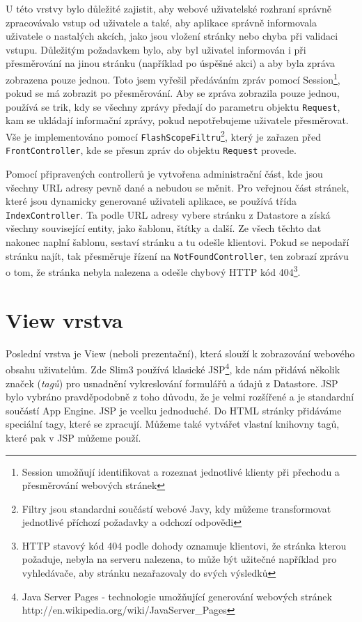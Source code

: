 U této vrstvy bylo důležité zajistit, aby webové uživatelské rozhraní správně zpracovávalo vstup od uživatele a také, aby aplikace správně informovala uživatele o nastalých akcích, jako jsou vložení stránky nebo chyba při validaci vstupu. Důležitým požadavkem bylo, aby byl uživatel informován i při přesměrování na jinou stránku (například po úspěšné akci) a aby byla zpráva zobrazena pouze jednou. Toto jsem vyřešil předáváním zpráv pomocí Session\footnote{Session umožňují identifikovat a rozeznat jednotlivé klienty při přechodu a přesměrování webových stránek}, pokud se má zobrazit po přesměrování. Aby se zpráva zobrazila pouze jednou, používá se trik, kdy se všechny zprávy předají do parametru objektu \verb|Request|, kam se ukládají informační zprávy, pokud nepotřebujeme uživatele přesměrovat. Vše je implementováno pomocí \verb|FlashScopeFiltru|\footnote{Filtry jsou standardni součástí webové Javy, kdy můžeme transformovat jednotlivé příchozí požadavky a odchozí odpovědi}, který je zařazen před \verb|FrontController|, kde se přesun zpráv do objektu \verb|Request| provede.

Pomocí připravených controllerů je vytvořena administrační část, kde jsou všechny URL adresy pevně dané a nebudou se měnit. Pro veřejnou část stránek, které jsou dynamicky generované uživateli aplikace, se používá třída \verb|IndexController|. Ta podle URL adresy vybere stránku z Datastore a získá všechny související entity, jako šablonu, štítky a další. Ze všech těchto dat nakonec naplní šablonu, sestaví stránku a tu odešle klientovi. Pokud se nepodaří stránku najít, tak přesměruje řízení na \verb|NotFoundController|, ten zobrazí zprávu o tom, že stránka nebyla nalezena a odešle chybový HTTP kód 404\footnote{HTTP stavový kód 404 podle dohody oznamuje klientovi, že stránka kterou požaduje, nebyla na serveru nalezena, to může být užitečné například pro vyhledávače, aby stránku nezařazovaly do svých výsledků}.

\section{View vrstva}
Poslední vrstva je View (neboli prezentační), která slouží k zobrazování webového obsahu uživatelům. Zde Slim3 používá klasické JSP\footnote{Java Server Pages - technologie umožňující generování webových stránek http://en.wikipedia.org/wiki/JavaServer\_Pages}, kde nám přidává několik značek (\emph{tagů}) pro usnadnění vykreslování formulářů a údajů z Datastore. JSP bylo vybráno pravděpodobně z toho důvodu, že je velmi rozšířené a je standardní součástí App Engine. JSP je vcelku jednoduché. Do HTML stránky přidáváme speciální tagy, které se zpracují. Můžeme také vytvářet vlastní knihovny tagů, které pak v JSP můžeme použí.